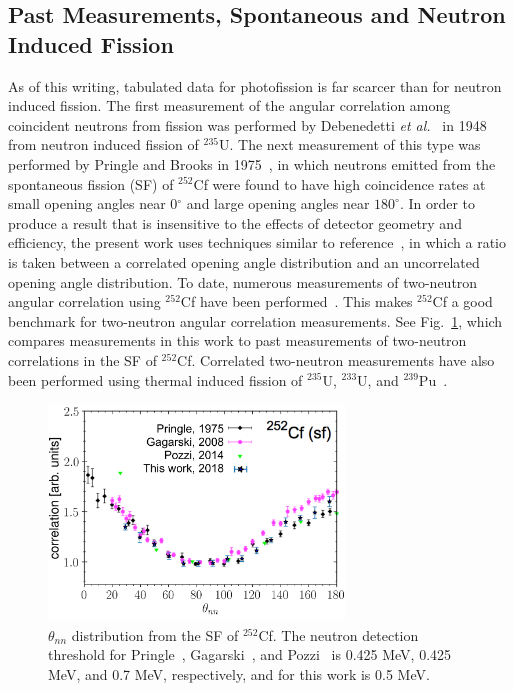 \subsection{Past Measurements, Spontaneous and Neutron Induced Fission}
As of this writing, tabulated data for photofission is far scarcer than for neutron induced fission.
The first measurement of the angular correlation among coincident neutrons from fission was performed by Debenedetti \emph{et al.}~\cite{1948twoNCorr} in 1948 from neutron induced fission of $^{235}\text{U}$.
The next measurement of this type was performed by Pringle and Brooks in 1975~\cite{1975Cf252}, in which neutrons emitted from the spontaneous fission (SF) of $^{252}$Cf were found to have high coincidence rates at small opening angles near 0$^{\circ}$ and large opening angles near $180^{\circ}$.
In order to produce a result that is insensitive to the effects of detector geometry and efficiency, the present work uses techniques similar to reference~\cite{1975Cf252}, in which a ratio is taken between a correlated opening angle distribution and an uncorrelated opening angle distribution.
To date, numerous measurements of two-neutron angular correlation using $^{252}$Cf have been performed~\cite{1975Cf252, 2008CF252, Pozzi2014}.
This makes $^{252}$Cf a good benchmark for two-neutron angular correlation measurements.
See Fig.~\ref{fig:Cf252_us_vs_them}, which compares measurements in this work to past measurements of two-neutron correlations in the SF of $^{252}$Cf.
Correlated two-neutron measurements have also been performed using thermal induced fission of $^{235}$U, $^{233}$U, and $^{239}$Pu~\cite{Sokolov2010}.
\begin{figure}[h]
\includegraphics[width=0.7\textwidth]{Content/Introduction/Cf252_us_vs_them.png}
\caption{$\theta_{nn}$ distribution from the SF of $^{252}$Cf.
 The neutron detection threshold for Pringle~\cite{1975Cf252}, Gagarski~\cite{2008CF252}, and Pozzi~\cite{Pozzi2016} is 0.425 MeV, 0.425 MeV, and 0.7 MeV, respectively, and for this work is 0.5 MeV.
}
\label{fig:Cf252_us_vs_them}
\end{figure}
